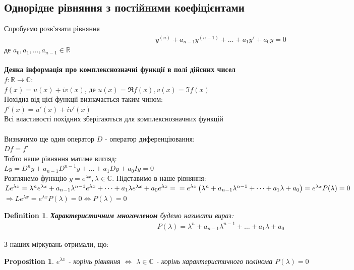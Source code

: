 \documentclass[a4paper, 10pt]{article}
\theoremstyle{theoremdd}
\theoremstyle{theoremdd}
\newtheorem{definition}[theorem]{Definition}
\theoremstyle{theoremdd}
\theoremstyle{theoremdd}
\theoremstyle{theoremdd}
\newtheorem{proposition}[theorem]{Proposition}
\theoremstyle{theoremdd}
\theoremstyle{theoremdd}
\theoremstyle{theoremdd}
\begin{document}
\subsection{Однорідне рівняння з постійними коефіцієнтами}
Спробуємо розв'язати рівняння
\begin{align*}
y^{(n)} + a_{n-1}y^{(n-1)}+\dots+a_1y'+a_0y = 0
\end{align*}
де $a_0, a_1,\dots,a_{n-1} \in \mathbb{R}$\\
\\ 
\textbf{Деяка інформація про комплекснозначні функції в полі дійсних чисел}\\
$f\colon \mathbb{R} \to \mathbb{C}:$\\
$f(x) = u(x) + iv(x)$, де $u(x) = \Re f(x), v(x) = \Im f(x)$\\
Похідна від цієї функції визначається таким чином:\\
$f'(x) = u'(x) + iv'(x)$\\
Всі властивості похідних зберігаються для комплекснозначних функцій
\\
\\
Визначимо ще один оператор $D$ - оператор диференціювання:\\
$Df = f'$\\
Тобто наше рівняння матиме вигляд:\\
$Ly = D^n y + a_{n-1}D^{n-1} y + \dots + a_1Dy + a_0Iy = 0$\\
Розглянемо функцію $\displaystyle y = e^{\lambda x}, \lambda \in \mathbb{C}$. Підставимо в наше рівняння:\\
$Le^{\lambda x} = \lambda^n e^{\lambda x} + a_{n-1} \lambda^{n-1} e^{\lambda x} + \dots + a_1 \lambda e^{\lambda x} + a_0 e^{\lambda x} = \\ = e^{\lambda x} \left( \lambda^n + a_{n-1} \lambda^{n-1} + \dots + a_1 \lambda + a_0 \right) = e^{\lambda x} P(\lambda) = 0$\\
$\Rightarrow Le^{\lambda x} = e^{\lambda x} P(\lambda) = 0 \iff P(\lambda) = 0$\\
\begin{definition}
 \textbf{Характеристичним многочленом} будемо називати вираз:
\begin{align*}
P(\lambda) = \lambda^n + a_{n-1} \lambda^{n-1} + \dots + a_1 \lambda + a_0
\end{align*}
\end{definition}
З наших міркувань отримали, що:\\
	\begin{proposition}
 $\displaystyle e^{\lambda x}$ - корінь рівняння $\iff$ $\lambda \in \mathbb{C}$ - корінь характеристичного полінома $P(\lambda) = 0$
	\end{proposition}
\end{document}
